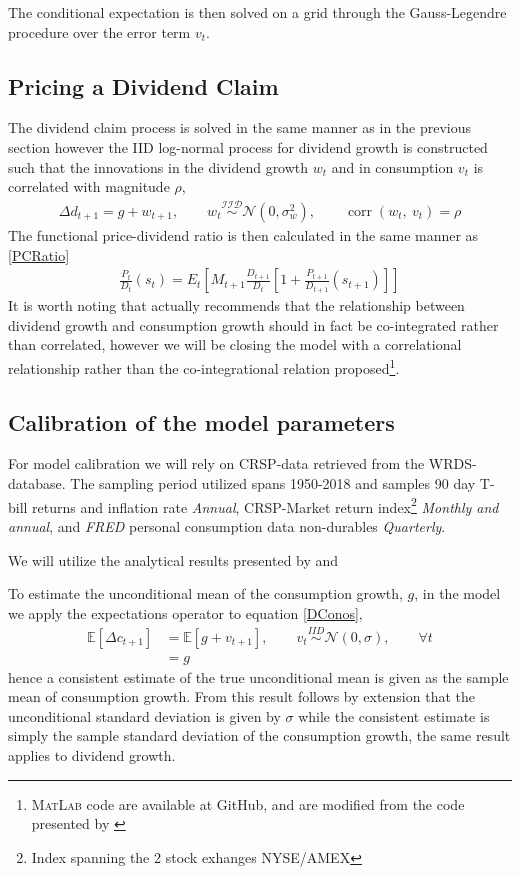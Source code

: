 The conditional expectation is then solved on a grid through the Gauss-Legendre procedure over the error term $v_t$.

\subsection{Pricing a Dividend Claim}
The dividend claim process is solved in the same manner as in the previous section however the IID log-normal process for dividend growth is constructed such that the innovations in the dividend growth $w_t$ and in consumption $v_t$ is correlated with magnitude $\rho$,
\begin{align}
    \Delta d_{t+1} = g + w_{t+1},\qquad w_t \overset{\mathcal{IID}}{\sim}\mathcal{N}\left(0,\sigma^2_w \right),\qquad \operatorname{corr}\left( w_t,\ v_t \right) = \rho
\end{align}
The functional price-dividend ratio is then calculated in the same manner as \eqref{PCRatio}
\begin{align}
    \frac{P_{t}}{D_{t}}\left(s_{t}\right)=E_{t}\left[M_{t+1} \frac{D_{t+1}}{D_{t}}\left[1+\frac{P_{t+1}}{D_{t+1}}\left(s_{t+1}\right)\right]\right] \label{pd_ratio}
\end{align}
It is worth noting that \citet{Campbell1999} actually recommends that the relationship between dividend growth and consumption growth should in fact be co-integrated rather than correlated, however we will be closing the model with a correlational relationship rather than the co-integrational relation proposed\footnote{\textsc{MatLab} code are available at GitHub, and are modified from the code presented by \citet{Costa2009}}. 

\subsection{Calibration of the model parameters}
For model calibration we will rely on CRSP-data retrieved from the WRDS-database. The sampling period utilized spans 1950-2018 and samples 90 day T-bill returns and inflation rate \textit{Annual}, CRSP-Market return index\footnote{Index spanning the 2 stock exhanges NYSE/AMEX} \textit{Monthly and annual}, and \textit{FRED} personal consumption data non-durables \textit{Quarterly}.  


We will utilize the analytical results presented by \citet{Campbell1999} and \citet{StigVinter2010}

To estimate the unconditional mean of the consumption growth, $g$, in the model we apply the expectations operator to equation \eqref{DConos},
\begin{align}
    \mathbb{E}\left[ \Delta c_{t+1} \right] &=  \mathbb{E}\left[ g + v_{t+1} \right],\qquad v_t\overset{IID}{\sim}\mathcal{N}\left(0,\sigma\right), \qquad \forall t\nonumber \\
    & = g
\end{align}
hence a consistent estimate of the true unconditional mean is given as the sample mean of consumption growth. From this result follows by extension that the unconditional standard deviation is given by $\sigma$ while the consistent estimate is simply the sample standard deviation of the consumption growth, the same result applies to dividend growth.

